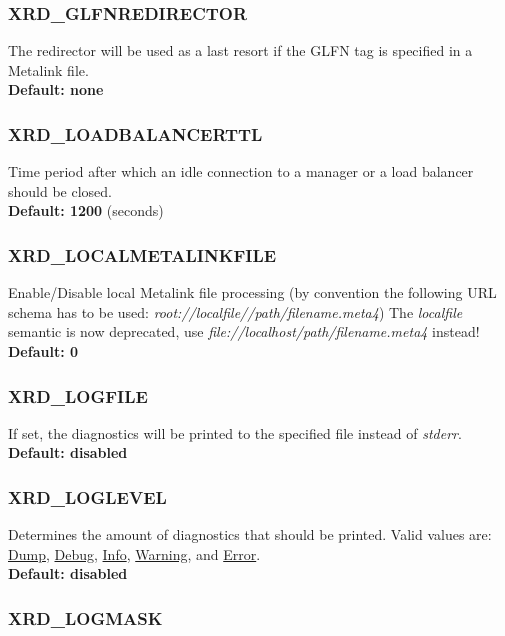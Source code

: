 \documentclass{article}
\begin{document}
		\subsubsection{XRD_GLFNREDIRECTOR}
		\label{env:glfnredirector}
		    The redirector will be used as a last resort if the GLFN tag is specified in a Metalink file. \\
		    \textbf{Default: none}
		    
		\subsubsection{XRD_LOADBALANCERTTL}
		\label{env:loadbalancerttl}
			Time period after which an idle connection to a manager or a load balancer should be closed. \\
			\textbf{Default: 1200} (seconds)
			
		\subsubsection{XRD_LOCALMETALINKFILE}
		\label{env:localmetalinkfile}
		    Enable/Disable local Metalink file processing (by convention the following URL schema has to be used: 
		    \textit{root://localfile//path/filename.meta4}) The \textit{localfile} semantic is now deprecated, use 
		    \textit{file://localhost/path/filename.meta4} instead! \\
		    \textbf{Default: 0}
		    
		\subsubsection{XRD_LOGFILE}
		\label{env:logfile}
			If set, the diagnostics will be printed to the specified file instead of \textit{stderr}. \\
			\textbf{Default: disabled}
			
		\subsubsection{XRD_LOGLEVEL}
		\label{env:loglevel}
			Determines the amount of diagnostics that should be printed. Valid values are: \ul{Dump}, 
			\ul{Debug}, \ul{Info}, \ul{Warning}, and \ul{Error}. \\
     	    \textbf{Default: disabled}
			
		\subsubsection{XRD_LOGMASK}
		\label{env:logmask}
		
\end{document}
